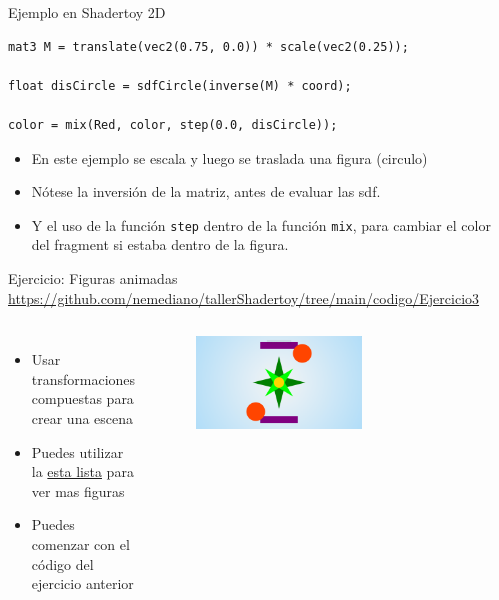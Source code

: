 \begin{frame}[fragile]{Ejemplo en Shadertoy 2D}
\begin{listing}
\begin{verbatim}
mat3 M = translate(vec2(0.75, 0.0)) * scale(vec2(0.25));

float disCircle = sdfCircle(inverse(M) * coord);

color = mix(Red, color, step(0.0, disCircle));
\end{verbatim}
\end{listing}
\begin{itemize}
    \item En este ejemplo se escala y luego se traslada una figura (circulo)
    \item Nótese la inversión de la matriz, antes de evaluar las sdf.
    \item Y el uso de la función \texttt{step} dentro de la función \texttt{mix}, para cambiar el color del fragment si estaba dentro de la figura.
\end{itemize}
\end{frame}

\begin{frame}{Ejercicio: Figuras animadas}
\url{https://github.com/nemediano/tallerShadertoy/tree/main/codigo/Ejercicio3}
\begin{columns}
     \begin{itemize}
         \item Usar transformaciones compuestas para crear una escena
         \item Puedes utilizar la \href{https://iquilezles.org/articles/distfunctions2d/}{esta lista} para ver mas figuras
         \item Puedes comenzar con el código del ejercicio anterior 
     \end{itemize}
        \begin{figure}[htb]
            \centering
            \includegraphics[width=0.6\textwidth]{img/Ejer3}
        \end{figure}
\end{columns}
\end{frame}
